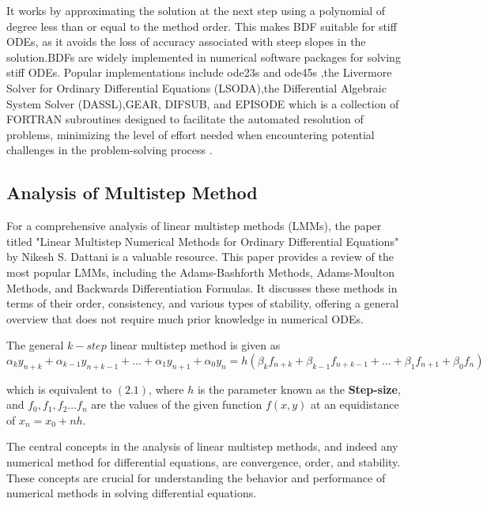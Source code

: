 \documentclass[a4paper, twoside]{report} %
\begin{document}
	It works by approximating the solution at the next step using a polynomial of degree less than or equal to the method order. This makes BDF suitable for stiff ODEs, as it avoids the loss of accuracy associated with steep slopes in the solution.BDFs are widely implemented in numerical software packages for solving stiff ODEs. Popular implementations include ode23s and ode45s \cite{shampine1997matlab},the Livermore Solver for Ordinary Differential Equations (LSODA),the Differential Algebraic System Solver (DASSL),GEAR, DIFSUB, and EPISODE \cite{Yatim2013} which is a collection of FORTRAN subroutines designed to facilitate the automated resolution of problems, minimizing the level of effort needed when encountering potential challenges in the problem-solving process \cite{thohura2013numerical}.


	\subsection{Analysis of Multistep Method}

	For a comprehensive analysis of linear multistep methods (LMMs), the paper titled "Linear Multistep Numerical Methods for Ordinary Differential Equations" by Nikesh S. Dattani is a valuable resource. This paper provides a review of the most popular LMMs, including the Adams-Bashforth Methods, Adams-Moulton Methods, and Backwards Differentiation Formulas. It discusses these methods in terms of their order, consistency, and various types of stability, offering a general overview that does not require much prior knowledge in numerical ODEs\cite{dattani2008linear}.

	The general $k-step$ linear multistep method is given as
	\begin{equation}
		\alpha_k y_{n+k} + \alpha_{k-1} y_{n+k-1} + \ldots + \alpha_1 y_{n+1} + \alpha_0 y_n = h \left( \beta_k f_{n+k} + \beta_{k-1} f_{n+k-1} + \ldots + \beta_1 f_{n+1} + \beta_0 f_n \right)
	\end{equation}

	which is equivalent to $(2.1)$, where $h$ is the parameter known as the \textbf{Step-size}, and $f_0, f_1, f_2 ... f_n$ are the values of the given function $f(x,y)$ at an equidistance of  $x_n = x_0 + nh$.

	The central concepts in the analysis of linear multistep methods, and indeed any numerical method for differential equations, are convergence, order, and stability. These concepts are crucial for understanding the behavior and performance of numerical methods in solving differential equations.
\end{document}
